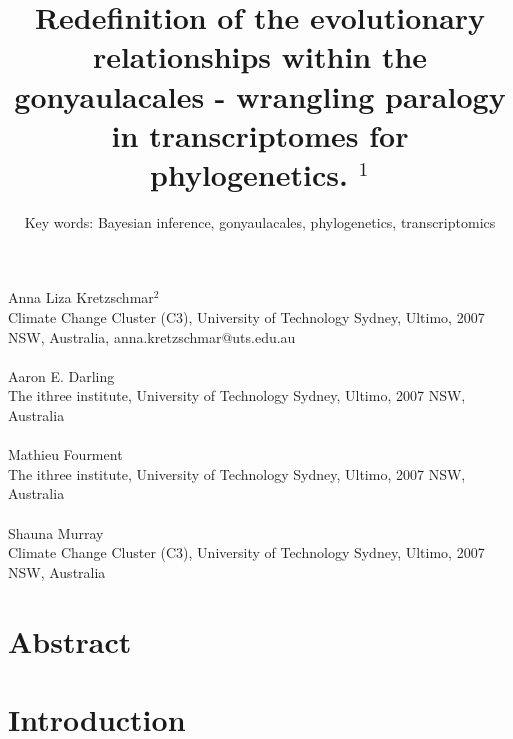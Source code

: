 \documentclass[12pt]{article}
\title{Redefinition of the evolutionary relationships within the gonyaulacales - wrangling paralogy in transcriptomes for phylogenetics. $^{1}$}
\author{Key words: Bayesian inference, gonyaulacales, phylogenetics, transcriptomics}
\date{}
\begin{document}
\maketitle
\paragraph{}Anna Liza Kretzschmar$^{2}$\\
Climate Change Cluster (C3), University of Technology Sydney, Ultimo, 2007 NSW, Australia, anna.kretzschmar@uts.edu.au
\paragraph{}Aaron E. Darling \\
The ithree institute, University of Technology Sydney, Ultimo, 2007 NSW, Australia
\paragraph{}Mathieu Fourment \\
The ithree institute, University of Technology Sydney, Ultimo, 2007 NSW, Australia
\paragraph{}Shauna Murray\\ 
Climate Change Cluster (C3), University of Technology Sydney, Ultimo, 2007 NSW, Australia
\newpage
\section{Abstract}
\newpage

\section{Introduction}
\end{document}
